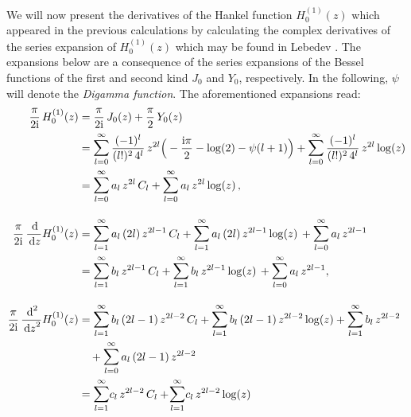 We will now present the derivatives of the Hankel function $H_0^{(1)}(z)$ which appeared in the previous calculations by calculating the complex derivatives of the series expansion of $H_0^{(1)}(z)$ which may be found in Lebedev \cite[Sec.\@~5.6]{lebedev}. 
The expansions below are a consequence of the series expansions of the Bessel functions of the first and second kind $J_0$ and $Y_0$, respectively.
In the following, $\psi$ will denote the \emph{Digamma function}. 
The aforementioned expansions read:
\begin{align*}
  \frac{\pi}{2 \ii} \, H_0^{(1)}(z)
  &= \frac{\pi}{2\ii} \, J_0(z) + \frac{\pi}{2}\, Y_0(z) \\
  &= \mathlarger{\sum}_{l = 0}^\infty \, \frac{(-1)^l}{(l!)^2 \, 4^l} \,  z^{2l} \Big( -\frac{\ii \pi}{2} - \log(2) - \psi(l + 1) \Big) 
  +  \mathlarger{\sum}_{l = 0}^\infty \, \frac{(-1)^l}{(l!)^2 \, 4^l} \,  z^{2l} \log(z) \\
  &= \mathlarger{\sum}_{l = 0}^\infty \, a_l \,  z^{2l} \, C_l 
   + \mathlarger{\sum}_{l = 0}^\infty \, a_l  \,z^{2l} \log(z)\,, \\[1.0em]
  \frac{\pi}{2\ii} \, \frac{\d{}}{\d z} H_0^{(1)}(z)
  &= \mathlarger{\sum}_{l = 1}^\infty \, a_l \,  (2l) \, z^{2l - 1} \, C_l 
  + \mathlarger{\sum}_{l = 1}^\infty \, a_l \, (2l)  \, z^{2l - 1} \log(z) \, 
  + \mathlarger{\sum}_{l = 0}^\infty \, a_l \, z^{2l - 1} \\
  &= \mathlarger{\sum}_{l = 1}^\infty \, b_l \, z^{2l - 1} \, C_l 
  + \mathlarger{\sum}_{l = 1}^\infty \, b_l \, z^{2l - 1} \log(z) \, 
  +  \mathlarger{\sum}_{l = 0}^\infty \, a_l \, z^{2l - 1}, \\[1.0em]
  \frac{\pi}{2\ii} \, \frac{\d{}^2}{\d z^2} H_0^{(1)}(z)
  &= \mathlarger{\sum}_{l = 1}^\infty \, b_l \, (2l - 1) \, z^{2l - 2} \, C_l 
  + \mathlarger{\sum}_{l = 1}^\infty \, b_l \, (2l - 1)\, z^{2l - 2} \log(z) 
  + \mathlarger{\sum}_{l = 1}^\infty \, b_l \, z^{2l - 2}\\
  &\quad + \mathlarger{\sum}_{l = 0}^\infty \, a_l \, (2l - 1) \, z^{2l - 2} \\
  &=   \mathlarger{\sum}_{l = 1}^\infty c_l \, z^{2l - 2} \, C_l 
  +  \!\mathlarger{\sum}_{l = 1}^\infty c_l \, z^{2l - 2} \log(z) 

\end{align*}
